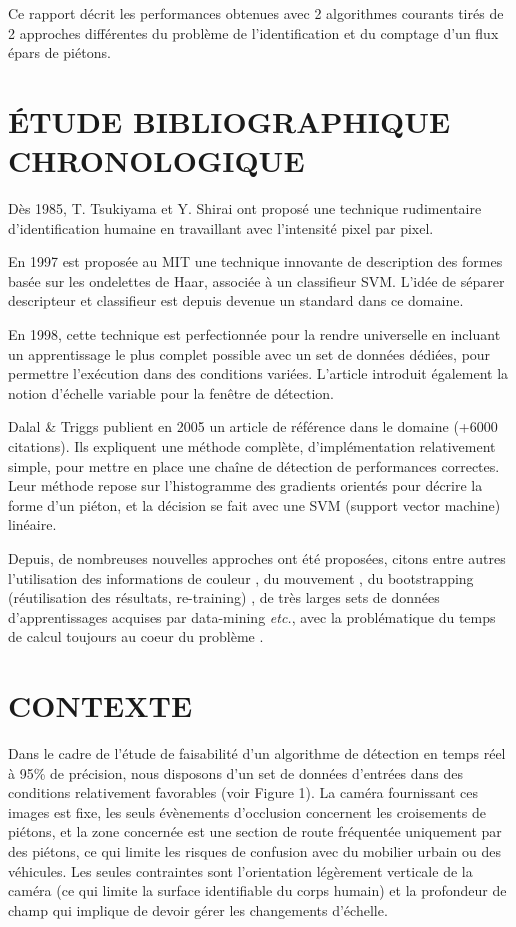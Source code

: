 \documentclass{article}
\begin{document}
	Ce rapport décrit les performances obtenues avec 2 algorithmes courants tirés de 2 approches différentes du problème de l'identification et du comptage d'un flux épars de piétons.

\section{\'{E}TUDE BIBLIOGRAPHIQUE CHRONOLOGIQUE}
\label{sec:bib}

	Dès 1985, T. Tsukiyama et Y. Shirai \cite{TV} ont proposé une technique rudimentaire d'identification humaine en travaillant avec l'intensité pixel par pixel.

	En 1997 est proposée au MIT \cite{Wavelet} une technique innovante de description des formes basée sur les ondelettes de Haar, associée à un classifieur SVM. L'idée de séparer descripteur et classifieur est depuis devenue un standard dans ce domaine.

	En 1998, cette technique est perfectionnée \cite{trainableDet} pour la rendre universelle en incluant un apprentissage le plus complet possible avec un set de données dédiées, pour permettre l'exécution dans des conditions variées. L'article introduit également la notion d'échelle variable pour la fenêtre de détection.

	Dalal \& Triggs \cite{HOG} publient en 2005 un article de référence dans le domaine (+6000 citations). Ils expliquent une méthode complète, d'implémentation relativement simple, pour mettre en place une chaîne de détection de performances correctes. Leur méthode repose sur l'histogramme des gradients orientés pour décrire la forme d'un piéton, et la décision se fait avec une SVM (support vector machine) linéaire.

	Depuis, de nombreuses nouvelles approches ont été proposées, citons entre autres l'utilisation des informations de couleur \cite{NewPedDet}, du mouvement \cite{VJones}, du bootstrapping (réutilisation des résultats, re-training) \cite{NewPedDet}, de très larges sets de données d'apprentissages acquises par data-mining \cite{FeatMining}  \textit{etc.}, avec la problématique du temps de calcul toujours au coeur du problème \cite{cowboy}.


\section{CONTEXTE}
\label{sec:contexte}

	Dans le cadre de l'étude de faisabilité d'un algorithme de détection en temps réel à 95\% de précision, nous disposons d'un set de données d'entrées dans des conditions relativement favorables (voir Figure 1). La caméra fournissant ces images est fixe, les seuls évènements d'occlusion concernent les croisements de piétons, et la zone concernée est une section de route fréquentée uniquement par des piétons, ce qui limite les risques de confusion avec du mobilier urbain ou des véhicules. Les seules contraintes sont l'orientation légèrement verticale de la caméra (ce qui limite la surface identifiable du corps humain) et la profondeur de champ qui implique de devoir gérer les changements d'échelle.\\
	
\end{document}
